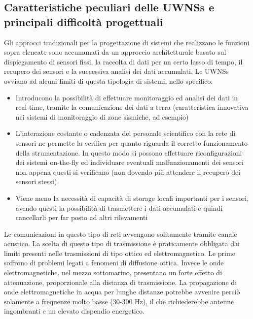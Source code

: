 \documentclass[Lau,binding=0.6cm]{sapthesis}
\begin{document}
\subsection{Caratteristiche peculiari delle UWNSs e principali difficoltà progettuali}
Gli approcci tradizionali per la progettazione di sistemi che realizzano le funzioni sopra elencate sono accumunati da un approccio architetturale basato sul dispiegamento di sensori fissi, la raccolta di dati per un certo lasso di tempo, il recupero dei sensori e la successiva analisi dei dati accumulati.\newline
Le UWNSs ovviano ad alcuni limiti di questa tipologia di sistemi, nello specifico: \newline
\begin{itemize}
\item Introducono la possibilità di effettuare monitoraggio ed analisi dei dati in real-time, tramite la comunicazione dei dati a terra (caratteristica innovativa nei sistemi di monitoraggio di zone sismiche, ad esempio)\newline
\item L'interazione costante o cadenzata del personale scientifico con la rete di sensori ne permette la verifica per quanto riguarda il corretto funzionamento della strumentazione. \newline In questo modo si possono effettuare riconfigurazioni dei sistemi on-the-fly ed individuare eventuali malfunzionamenti dei sensori non appena questi si verificano (non dovendo più attendere il recupero dei sensori stessi)\newline
\item Viene meno la necessità di capacità di storage locali importanti per i sensori, avendo questi la possibilità di trasmettere i dati accumulati e quindi cancellarli per far posto ad altri rilevamenti
\end{itemize}
Le comunicazioni in questo tipo di reti avvengono solitamente tramite canale acustico. La scelta di questo tipo di trasmissione è praticamente obbligata dai limiti presenti nelle trasmissioni di tipo ottico ed elettromagnetico. Le prime soffrono di problemi legati a fenomeni di diffusione ottica.  Invece le onde elettromagnetiche, nel mezzo sottomarino, presentano un forte effetto di attenuazione, proporzionale alla distanza di trasmissione. La propagazione di onde elettromagnetiche in acqua per lunghe distanze potrebbe avvenire perciò solamente a frequenze molto basse (30-300 Hz), il che richiederebbe antenne ingombranti e un elevato dispendio energetico.
\end{document}
